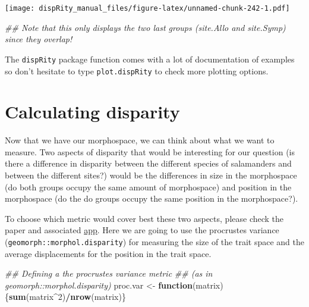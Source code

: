 \documentclass[
]{book}
\newenvironment{Shaded}{\begin{snugshade}}{\end{snugshade}}
\newcommand{\CommentTok}[1]{\textcolor[rgb]{0.56,0.35,0.01}{\textit{#1}}}
\newcommand{\ControlFlowTok}[1]{\textcolor[rgb]{0.13,0.29,0.53}{\textbf{#1}}}
\newcommand{\DecValTok}[1]{\textcolor[rgb]{0.00,0.00,0.81}{#1}}
\newcommand{\KeywordTok}[1]{\textcolor[rgb]{0.13,0.29,0.53}{\textbf{#1}}}
\newcommand{\NormalTok}[1]{#1}
\newcommand{\OperatorTok}[1]{\textcolor[rgb]{0.81,0.36,0.00}{\textbf{#1}}}
\newcommand{\StringTok}[1]{\textcolor[rgb]{0.31,0.60,0.02}{#1}}
\begin{document}
\texttt{[image: dispRity\_manual\_files/figure-latex/unnamed-chunk-242-1.pdf]}

\begin{Shaded}
\begin{Highlighting}[]
\CommentTok{\#\# Note that this only displays the two last groups (site.Allo and site.Symp) since they overlap!}
\end{Highlighting}
\end{Shaded}

The \texttt{dispRity} package function comes with a lot of documentation of examples so don't hesitate to type \texttt{plot.dispRity} to check more plotting options.

\hypertarget{calculating-disparity-2}{%
\section{Calculating disparity}\label{calculating-disparity-2}}

Now that we have our morphospace, we can think about what we want to measure.
Two aspects of disparity that would be interesting for our question (is there a difference in disparity between the different species of salamanders and between the different sites?) would be the differences in size in the morphospace (do both groups occupy the same amount of morphospace) and position in the morphospace (do the do groups occupy the same position in the morphospace?).

To choose which metric would cover best these two aspects, please check the \citet{moms} paper and associated \href{https://tguillerme.shinyapps.io/moms/}{app}. Here we are going to use the procrustes variance (\texttt{geomorph::morphol.disparity}) for measuring the size of the trait space and the average displacements \citep{moms} for the position in the trait space.

\begin{Shaded}
\begin{Highlighting}[]
\CommentTok{\#\# Defining a the procrustes variance metric}
\CommentTok{\#\# (as in geomorph::morphol.disparity)}
\NormalTok{proc.var \textless{}{-}}\StringTok{ }\ControlFlowTok{function}\NormalTok{(matrix) \{}\KeywordTok{sum}\NormalTok{(matrix}\OperatorTok{\^{}}\DecValTok{2}\NormalTok{)}\OperatorTok{/}\KeywordTok{nrow}\NormalTok{(matrix)\}}
\end{Highlighting}
\end{Shaded}
\end{document}
